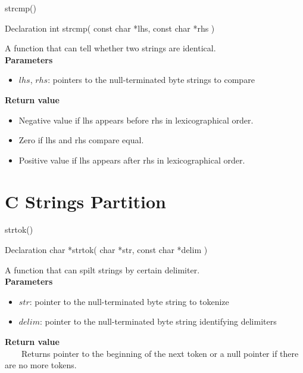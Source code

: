 \documentclass[12pt]{beamer}
\begin{document}
\begin{frame}{strcmp()}
    \begin{block}{Declaration}
        int strcmp( const char *lhs, const char *rhs )
    \end{block}
    A function that can tell whether two strings are identical. \\
    \textbf{Parameters}
    \begin{itemize}
        \item $lhs$, $rhs$: pointers to the null-terminated byte strings to compare
    \end{itemize}
    \textbf{Return value}
    \begin{itemize}
        \item Negative value if lhs appears before rhs in lexicographical order.
        \item Zero if lhs and rhs compare equal.
        \item Positive value if lhs appears after rhs in lexicographical order.
    \end{itemize}
\end{frame}

\section{C Strings Partition}
\begin{frame}{strtok()}
    \begin{block}{Declaration}
        char *strtok( char *str, const char *delim )
    \end{block}
    A function that can spilt strings by certain delimiter. \\
    \textbf{Parameters}
    \begin{itemize}
        \item $str$: pointer to the null-terminated byte string to tokenize
        \item $delim$: pointer to the null-terminated byte string identifying delimiters
    \end{itemize}
    \textbf{Return value} \\
    \ \ \ \ Returns pointer to the beginning of the next token or a null pointer if there are no more tokens.
\end{frame}
\end{document}
